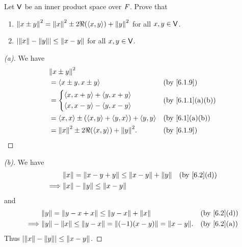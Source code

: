 \begin{ex}\label{ex:6.1.19}
  Let \(\mathsf{V}\) be an inner product space over \(\mathit{F}\).
  Prove that
  \begin{enumerate}
    \item \(\left\lVert x \pm y\right\rVert^2 = \left\lVert x\right\rVert^2 \pm 2 \Re(\left\langle x, y\right\rangle) + \left\lVert y\right\rVert^2\) for all \(x, y \in \mathsf{V}\).
    \item \(\left\lvert\left\lVert x\right\rVert - \left\lVert y\right\rVert\right\rvert \leq \left\lVert x - y\right\rVert\) for all \(x, y \in \mathsf{V}\).
  \end{enumerate}
\end{ex}

\begin{proof}[(a)]
  We have
  \begin{align*}
     & \norm{x \pm y}^2                                                                          \\
     & = \inn{x \pm y, x \pm y}                                &  & \text{(by \cref{6.1.9})}     \\
     & = \begin{dcases}
           \inn{x, x + y} + \inn{y, x + y} \\
           \inn{x, x - y} - \inn{y, x - y}
         \end{dcases}                      &  & \text{(by \cref{6.1.1}(a)(b))}                   \\
     & = \inn{x, x} \pm (\inn{x, y} + \inn{y, x}) + \inn{y, y} &  & \text{(by \cref{6.1}(a)(b))} \\
     & = \norm{x}^2 \pm 2 \Re(\inn{x, y}) + \norm{y}^2.        &  & \text{(by \cref{6.1.9})}
  \end{align*}
\end{proof}

\begin{proof}[(b)]
  We have
  \begin{align*}
             & \norm{x} = \norm{x - y + y} \leq \norm{x - y} + \norm{y} &  & \text{(by \cref{6.2}(d))} \\
    \implies & \norm{x} - \norm{y} \leq \norm{x - y}
  \end{align*}
  and
  \begin{align*}
             & \norm{y} = \norm{y - x + x} \leq \norm{y - x} + \norm{x}                   &  & \text{(by \cref{6.2}(d))} \\
    \implies & \norm{y} - \norm{x} \leq \norm{y - x} = \norm{(-1)(x - y)} = \norm{x - y}. &  & \text{(by \cref{6.2}(a))}
  \end{align*}
  Thus \(\left\lvert\left\lVert x\right\rVert - \left\lVert y\right\rVert\right\rvert \leq \left\lVert x - y\right\rVert\).
\end{proof}
